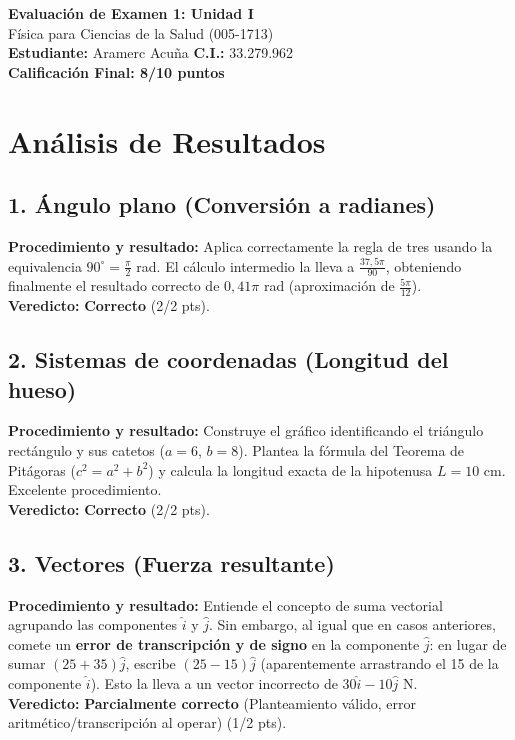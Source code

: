 \documentclass[12pt]{article}
\begin{document}
\begin{center}
    \Large \textbf{Evaluación de Examen 1: Unidad I} \\
    \large Física para Ciencias de la Salud (005-1713) \\
    \vspace{0.5cm}
    \textbf{Estudiante:} Aramerc Acuña \quad \textbf{C.I.:} 33.279.962
    \vspace{0.3cm} \\
    \large \textbf{Calificación Final: 8/10 puntos}
\end{center}

\vspace{0.5cm}

\section*{Análisis de Resultados}

\subsection*{1. Ángulo plano (Conversión a radianes)}
\textbf{Procedimiento y resultado:} Aplica correctamente la regla de tres usando la equivalencia $90^\circ = \frac{\pi}{2}$ rad. El cálculo intermedio la lleva a $\frac{37,5\pi}{90}$, obteniendo finalmente el resultado correcto de $0,41\pi$ rad (aproximación de $\frac{5\pi}{12}$). \\
\textbf{Veredicto:} \textbf{Correcto} (2/2 pts).

\subsection*{2. Sistemas de coordenadas (Longitud del hueso)}
\textbf{Procedimiento y resultado:} Construye el gráfico identificando el triángulo rectángulo y sus catetos ($a=6$, $b=8$). Plantea la fórmula del Teorema de Pitágoras ($c^2 = a^2 + b^2$) y calcula la longitud exacta de la hipotenusa $L = 10$ cm. Excelente procedimiento. \\
\textbf{Veredicto:} \textbf{Correcto} (2/2 pts).

\subsection*{3. Vectores (Fuerza resultante)}
\textbf{Procedimiento y resultado:} Entiende el concepto de suma vectorial agrupando las componentes $\hat{i}$ y $\hat{j}$. Sin embargo, al igual que en casos anteriores, comete un \textbf{error de transcripción y de signo} en la componente $\hat{j}$: en lugar de sumar $(25 + 35)\hat{j}$, escribe $(25 - 15)\hat{j}$ (aparentemente arrastrando el 15 de la componente $\hat{i}$). Esto la lleva a un vector incorrecto de $30\hat{i} - 10\hat{j}$ N. \\
\textbf{Veredicto:} \textbf{Parcialmente correcto} (Planteamiento válido, error aritmético/transcripción al operar) (1/2 pts).
\end{document}
